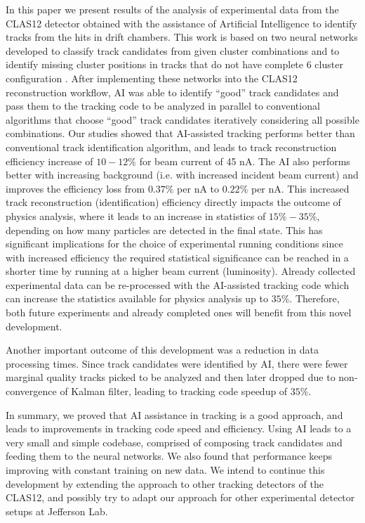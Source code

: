 \documentclass[aps,prl,preprint,12pt]{revtex4}
\begin{document}
In this paper we present results of the analysis of experimental data from the CLAS12 detector obtained with the assistance of Artificial Intelligence
to identify tracks from the hits in drift chambers. This work is based on two neural networks developed to classify track candidates from
given cluster combinations \cite{Gavalian:2020oxg} and to identify missing cluster positions in tracks that do not have complete 6 cluster configuration \cite{Gavalian:2020xmc}. After implementing these networks into the CLAS12 reconstruction workflow, AI was able to identify ``good'' track candidates 
and pass them to the tracking code to be analyzed in parallel to conventional algorithms that choose ``good'' track candidates iteratively considering all possible combinations. 
Our studies showed that AI-assisted tracking performs better than conventional track identification algorithm, and leads to track reconstruction efficiency increase of $10-12\%$ for beam current of 45 nA. The AI also performs better with increasing background (i.e. with increased incident beam current) and improves the efficiency loss from $0.37\%$ per nA to $0.22\%$ per nA.
This increased track reconstruction (identification) efficiency directly impacts the outcome of physics analysis, where it leads to an increase in statistics of 
$15\%-35\%$, depending on how many particles are detected in the final state. This has significant implications for the choice of experimental running conditions since with increased efficiency the required statistical significance can be reached in a shorter time by running at a higher beam current (luminosity). Already collected experimental data can be re-processed with the AI-assisted tracking
code which can increase the statistics available for physics analysis up to $35\%$. Therefore, both future experiments and already completed ones will benefit 
from this novel development.

Another important outcome of this development was a reduction in data processing times. Since track candidates were identified by AI, there were fewer marginal quality tracks picked to be analyzed and then later dropped due to non-convergence of Kalman filter, leading to tracking code speedup of $35\%$.

In summary, we proved that AI assistance in tracking is a good approach, and leads to improvements in tracking code speed and efficiency. 
Using AI leads to a very small and simple codebase, comprised of composing track candidates and feeding them to the neural networks. 
We also found that performance keeps improving with constant training on new data. We intend to continue this development by extending 
the approach to other tracking detectors of the CLAS12, and possibly try to adapt our approach for other experimental detector setups at Jefferson Lab.
\end{document}
